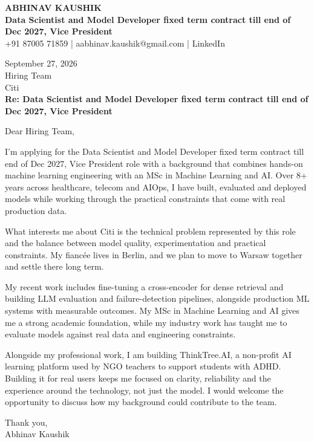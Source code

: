 \documentclass[10pt,a4paper]{article}
\begin{document}
\begin{center}
{\Large\bfseries ABHINAV KAUSHIK}\\[2pt]
{\bfseries Data Scientist and Model Developer fixed term contract till end of Dec 2027, Vice President}\\[2pt]
+91 87005 71859 \quad | \quad aabhinav.kaushik@gmail.com \quad | \quad LinkedIn
\end{center}
\vspace{8pt}
September 27, 2026\\[6pt]
Hiring Team\\
Citi\\[4pt]
\textbf{Re: Data Scientist and Model Developer fixed term contract till end of Dec 2027, Vice President}

Dear Hiring Team,

I’m applying for the Data Scientist and Model Developer fixed term contract till end of Dec 2027, Vice President role with a background that combines hands-on machine learning engineering with an MSc in Machine Learning and AI. Over 8+ years across healthcare, telecom and AIOps, I have built, evaluated and deployed models while working through the practical constraints that come with real production data.

What interests me about Citi is the technical problem represented by this role and the balance between model quality, experimentation and practical constraints. My fiancée lives in Berlin, and we plan to move to Warsaw together and settle there long term.

My recent work includes fine-tuning a cross-encoder for dense retrieval and building LLM evaluation and failure-detection pipelines, alongside production ML systems with measurable outcomes. My MSc in Machine Learning and AI gives me a strong academic foundation, while my industry work has taught me to evaluate models against real data and engineering constraints.

Alongside my professional work, I am building ThinkTree.AI, a non-profit AI learning platform used by NGO teachers to support students with ADHD. Building it for real users keeps me focused on clarity, reliability and the experience around the technology, not just the model. I would welcome the opportunity to discuss how my background could contribute to the team.

Thank you,\\
Abhinav Kaushik
\end{document}

